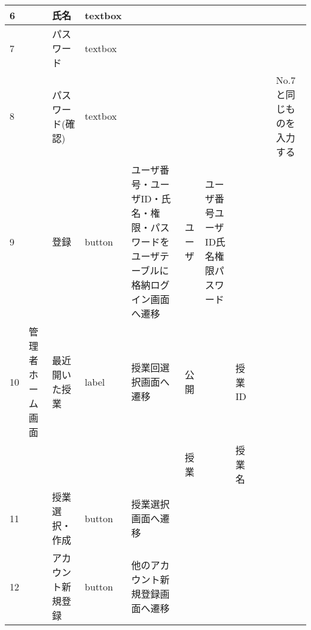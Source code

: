 \begin{table}[]
\begin{tabular}{|l|l|l|l|l|l|l|l|l|l|l|}
6   &               & 氏名               & textbox  &                                                                   &         &                       &                    &                 &                               &                                                                \\ \hline
7   &               & パスワード            & textbox  &                                                                   &         &                       &                    &                 &                               &                                                                \\ \hline
8   &               & パスワード(確認)        & textbox  &                                                                   &         &                       &                    &                 &                               & No.7と同じものを入力する                                                 \\ \hline
9   &               & 登録               & button   & ユーザ番号・ユーザID・氏名・権限・パスワードをユーザテーブルに格納ログイン画面へ遷移                       & ユーザ     & ユーザ番号ユーザID氏名権限パスワード   &                    &                 &                               &                                                                \\ \hline
10  & 管理者ホーム画面      & 最近開いた授業          & label    & 授業回選択画面へ遷移                                                        & 公開      &                       & 授業ID               &                 &                               &                                                                \\ \hline
    &               &                  &          &                                                                   & 授業      &                       & 授業名                &                 &                               &                                                                \\ \hline
11  &               & 授業選択・作成          & button   & 授業選択画面へ遷移                                                         &         &                       &                    &                 &                               &                                                                \\ \hline
12  &               & アカウント新規登録        & button   & 他のアカウント新規登録画面へ遷移                                                  &         &                       &                    &                 &                               &                                                                \\ \hline

\end{tabular}
\end{table}
